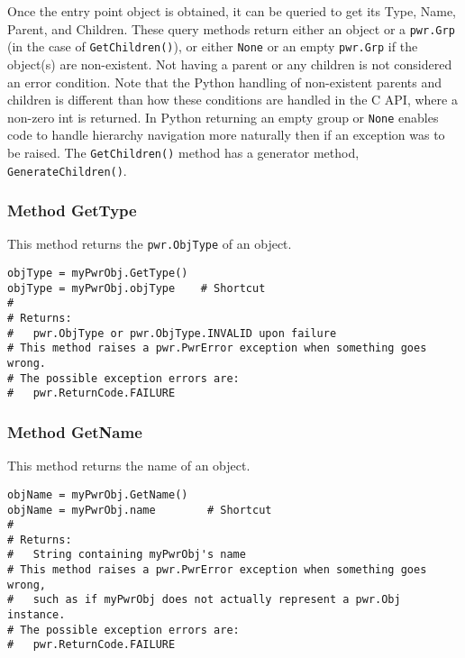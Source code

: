 \documentclass[12pt]{report} %
\begin{document}
\begin{appendices}
Once the entry point object is obtained, it can be queried to get its Type,
Name, Parent, and Children. These query methods return either an object or a
\texttt{pwr.Grp} (in the case of \texttt{GetChildren()}), or either \texttt{None}
or an empty \texttt{pwr.Grp} if the object(s) are non-existent. Not having a
parent or any children is not considered an error condition. Note that the
Python handling of non-existent parents and children is different than how
these conditions are handled in the C API, where a non-zero int is returned. In
Python returning an empty group or \texttt{None} enables code to handle
hierarchy navigation more naturally then if an exception was to be raised. The
\texttt{GetChildren()} method has a generator method, \texttt{GenerateChildren()}.

\subsubsection{Method GetType} \label{meth:GetType}

This method returns the \texttt{pwr.ObjType} of an object.

\begin{center}\begin{minipage}{.95\linewidth}\begin{lstlisting}
objType = myPwrObj.GetType()
objType = myPwrObj.objType    # Shortcut
#
# Returns:
#   pwr.ObjType or pwr.ObjType.INVALID upon failure
# This method raises a pwr.PwrError exception when something goes wrong.
# The possible exception errors are:
#   pwr.ReturnCode.FAILURE
\end{lstlisting}\end{minipage}\end{center}

\subsubsection{Method GetName} \label{meth:GetName}

This method returns the name of an object.

\begin{center}\begin{minipage}{.95\linewidth}\begin{lstlisting}
objName = myPwrObj.GetName()
objName = myPwrObj.name        # Shortcut
#
# Returns:
#   String containing myPwrObj's name
# This method raises a pwr.PwrError exception when something goes wrong,
#   such as if myPwrObj does not actually represent a pwr.Obj instance.
# The possible exception errors are:
#   pwr.ReturnCode.FAILURE
\end{lstlisting}\end{minipage}\end{center}


\end{appendices}
\end{document}
